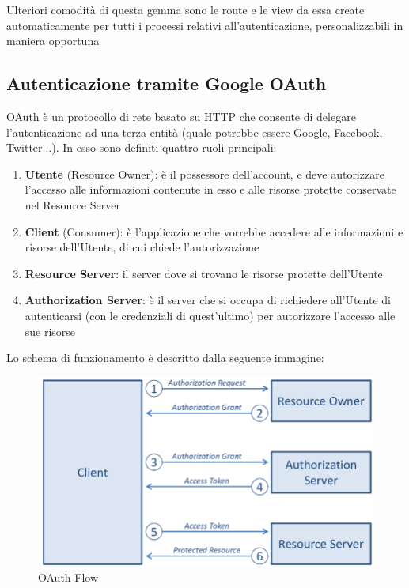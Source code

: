 \documentclass[Lau, binding=0.6cm, oneside]{sapthesis}
\begin{document}
Ulteriori comodità di questa gemma sono le route e le view da essa create automaticamente per tutti i processi relativi all’autenticazione, personalizzabili in maniera opportuna

\subsection{Autenticazione tramite Google OAuth}

OAuth è un protocollo di rete basato su HTTP che consente di delegare l’autenticazione ad una terza entità (quale potrebbe essere Google, Facebook, Twitter...). In esso sono definiti quattro ruoli principali:

\begin{enumerate}
	\item \textbf{Utente} (Resource Owner): è il possessore dell’account, e deve autorizzare l’accesso alle informazioni contenute in esso e alle risorse protette conservate nel Resource Server
	\item \textbf{Client} (Consumer): è l’applicazione che vorrebbe accedere alle informazioni e risorse dell’Utente, di cui chiede l’autorizzazione
	\item \textbf{Resource Server}: il server dove si trovano le risorse protette dell’Utente
	\item \textbf{Authorization Server}: è il server che si occupa di richiedere all’Utente di autenticarsi (con le credenziali di quest’ultimo) per autorizzare l’accesso alle sue risorse
\end{enumerate}

Lo schema di funzionamento è descritto dalla seguente immagine:\\

\begin{figure}[H]
	\centering
	\includegraphics[width=0.90\linewidth]{images/oauth}
	\caption{OAuth Flow}
	\label{fig:oauth}
\end{figure}
\end{document}
